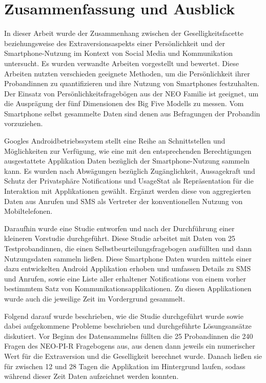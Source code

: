 
\chapter{Zusammenfassung und Ausblick}
\label{ch:Zusammenfassung}


In dieser Arbeit wurde der Zusammenhang zwischen der Geselligkeitsfacette beziehungsweise des Extraversionsaspekts
einer Persönlichkeit und der Smartphone-Nutzung im Kontext von Social Media und Kommunikation untersucht.
Es wurden verwandte Arbeiten vorgestellt und bewertet. 
Diese Arbeiten nutzten verschieden geeignete Methoden, um die Persönlichkeit ihrer Probandinnen zu quantifizieren und ihre Nutzung von Smartphones festzuhalten.
Der Einsatz von Persönlichkeitsfragebögen aus der NEO Familie ist geeignet, um die Ausprägung der fünf Dimensionen des Big Five Modells zu messen.
Vom Smartphone selbst gesammelte Daten sind denen aus Befragungen der Probandin vorzuziehen.
\par
Googles Androidbetriebssystem stellt eine Reihe an Schnittstellen und Möglichkeiten zur Verfügung, wie eine mit den entsprechenden Berechtigungen ausgestattete Applikation
Daten bezüglich der Smartphone-Nutzung sammeln kann.
Es wurden nach Abwägungen bezüglich Zugänglichkeit, Aussagekraft und Schutz der Privatsphäre Notifications und UsageStat als Repräsentation für die Interaktion mit Applikationen gewählt.
Ergänzt werden diese von aggregierten Daten aus Anrufen und SMS als Vertreter der konventionellen Nutzung von Mobiltelefonen.
\par
Daraufhin wurde eine Studie entworfen und nach der Durchführung einer kleineren Vorstudie durchgeführt.
Diese Studie arbeitet mit Daten von 25 Testprobandinnen, die einen Selbstbeurteilungsfragebogen ausfüllten und dann Nutzungsdaten sammeln ließen.
Diese Smartphone Daten wurden mittels einer dazu entwickelten Android Applikation erhoben und umfassen Details zu SMS und Anrufen, sowie eine Liste aller erhaltener Notifications von einem vorher bestimmtem Satz von Kommunikationsapplikationen.
Zu diesen Applikationen wurde auch die jeweilige Zeit im Vordergrund gesammelt.

Folgend darauf wurde beschrieben, wie die Studie durchgeführt wurde sowie dabei aufgekommene Probleme beschrieben und durchgeführte Lösungsansätze diskutiert.
Vor Beginn des Datensammelns füllten die 25 Probandinnen die 240 Fragen des NEO-PI-R Fragebogens aus, aus denen dann jeweils ein numerischer Wert für die Extraversion und die Geselligkeit berechnet wurde.
Danach ließen sie für zwischen 12 und 28 Tagen die Applikation im Hintergrund laufen, sodass während dieser Zeit Daten aufzeichnet werden konnten.

